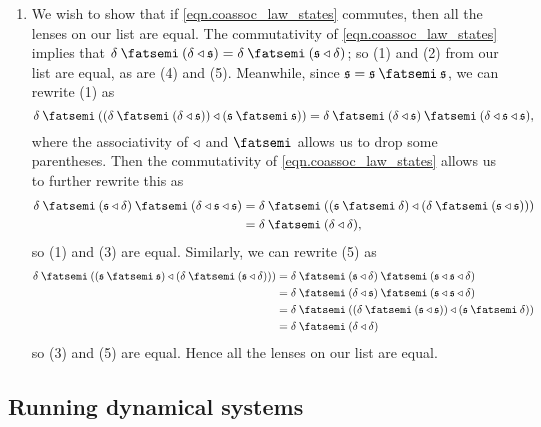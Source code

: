\documentclass[Book-Poly]{subfiles}
\begin{document}
\begin{exercise}
\begin{solution}
\begin{enumerate}
    \item We wish to show that if \eqref{eqn.coassoc_law_states} commutes, then all the lenses on our list are equal.
    The commutativity of \eqref{eqn.coassoc_law_states} implies that $\delta\then(\delta\tri\ema{s})=\delta\then(\ema{s}\tri\delta)$; so (1) and (2) from our list are equal, as are (4) and (5).
    Meanwhile, since $\ema{s}=\ema{s}\then\ema{s}$, we can rewrite (1) as
    \[
        \delta\then((\delta\then(\delta\tri\ema{s}))\tri(\ema{s}\then\ema{s}))=\delta\then(\delta\tri\ema{s})\then(\delta\tri\ema{s}\tri\ema{s}),
    \]
    where the associativity of $\mathbin{\triangleleft}$ and $\then$ allows us to drop some parentheses.
    Then the commutativity of \eqref{eqn.coassoc_law_states} allows us to further rewrite this as
    \begin{align*}
        \delta\then(\ema{s}\tri\delta)\then(\delta\tri\ema{s}\tri\ema{s})&=\delta\then((\ema{s}\then\delta)\tri(\delta\then(\ema{s}\tri\ema{s})))\\
        &=\delta\then(\delta\tri\delta),
    \end{align*}
    so (1) and (3) are equal.
    Similarly, we can rewrite (5) as
    \begin{align*}
        \delta\then((\ema{s}\then\ema{s})\tri(\delta\then(\ema{s}\tri\delta)))&=\delta\then(\ema{s}\tri\delta)\then(\ema{s}\tri\ema{s}\tri\delta)\\
        &=\delta\then(\delta\tri\ema{s})\then(\ema{s}\tri\ema{s}\tri\delta)\\
        &=\delta\then((\delta\then(\ema{s}\tri\ema{s}))\tri(\ema{s}\then\delta))\\
        &=\delta\then(\delta\tri\delta)
    \end{align*}
    so (3) and (5) are equal.
    Hence all the lenses on our list are equal.
\end{enumerate}
\end{solution}
\end{exercise}

\subsection{Running dynamical systems}\label{subsec.comon.sharp.state.run}
\end{document}
